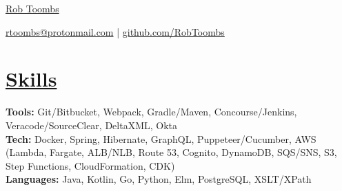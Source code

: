 \documentclass[10pt,letterpaper]{article}
\begin{document}

\centerline{\Huge \href{https://www.reddit.com/r/EngineeringResumes/wiki/index}{Rob Toombs}}

\vspace{5pt}


\centerline{\href{https://www.reddit.com/r/EngineeringResumes/wiki/index\#wiki_contact_information}{rtoombs@protonmail.com} | \href{https://www.reddit.com/r/EngineeringResumes/wiki/index\#wiki_portfolios}{github.com/RobToombs}}

\vspace{-10pt}


\section*{\href{https://www.reddit.com/r/EngineeringResumes/wiki/index\#wiki_skills}{Skills}}
\textbf{Tools:} Git/Bitbucket, Webpack, Gradle/Maven, Concourse/Jenkins, Veracode/SourceClear, DeltaXML, Okta \\
\textbf{Tech:} Docker, Spring, Hibernate, GraphQL, Puppeteer/Cucumber, AWS (Lambda, Fargate, ALB/NLB, Route 53, Cognito, DynamoDB, SQS/SNS, S3, Step Functions, CloudFormation, CDK)  \\
\textbf{Languages:} Java, Kotlin, Go, Python, Elm, PostgreSQL, XSLT/XPath

\vspace{-6.5pt}

\end{document}
